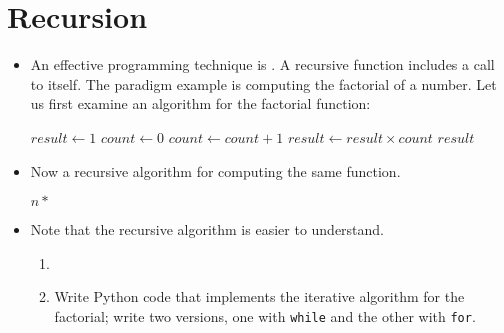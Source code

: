 \documentclass[a4paper]{article}
\begin{document}
{\section{Recursion}

\begin{itemize}

\item An effective programming technique is . A recursive
function includes a call to itself. The paradigm example is computing the
factorial of a number. Let us first examine an  algorithm for
the factorial function:

\begin{ucodeframe}
\vspace{1em}
\begin{algorithmic}
\State $result \gets 1$
\State $count \gets 0$
		\State $count \gets count + 1$
		\State $result \gets result \times count$
	\EndWhile
\State \Return $result$
\EndFunction
\end{algorithmic}
\end{ucodeframe}

\item Now a recursive algorithm for computing the same function.

\begin{ucodeframe}
\vspace{1em}
\begin{algorithmic}
\State {}
\Else
\State \Return $n*$ 
\EndIf
\EndFunction
\end{algorithmic}

\end{ucodeframe}
\item Note that the recursive algorithm is easier to understand. 

\begin{uexercise}
\begin{enumerate}
\item[]
\item Write Python code that implements the iterative algorithm for
the factorial; write two versions, one with \Verb+while+ and the other with
\Verb+for+.

\begin{hide}
\begin{usolution}
\begin{ucodeframe}
\end{ucodeframe}


\end{usolution}
\end{hide}
\end{enumerate}
\end{uexercise}
\end{itemize}}
\end{document}
